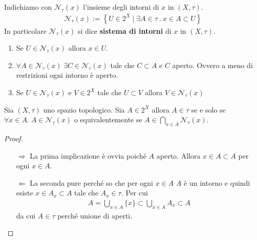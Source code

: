 \begin{definition}
	Indichiamo con $\mathcal{N}_\tau(x)$ l'insieme degli intorni di $x$ in $(X,\tau)$. 
	\begin{equation}
	\begin{aligned}
		\mathcal{N}_\tau(x) := \left\{ U \in 2^X \mid \exists A \in \tau\ .\ x \in A \subset U \right\}
	\end{aligned}
	\end{equation}
	In particolare $\mathcal{N}_\tau(x)$ si dice \textbf{sistema di intorni} di $x$ in $(X, \tau)$.
\end{definition}

\begin{remark}
	\label{rmk:intorni_top}
	\begin{enumerate}
		\item Se $U \in \mathcal{N}_\tau(x)$ allora $x \in U$.
		\item $\forall A \in \mathcal{N}_\tau(x) \; \exists C \in \mathcal{N}_\tau(x)$ tale che $C \subset A$ e $C$ aperto. Ovvero a meno di restrizioni ogni intorno è aperto.
		\item Se $U \in \mathcal{N}_\tau(x)$ e $V \in 2^X$ tale che $U \subset V$ allora $V \in \mathcal{N}_\tau(x)$ 
	\end{enumerate}	
\end{remark}

\begin{proposition}
	Sia $(X,\tau)$ uno spazio topologico. Sia $A \in 2^X$ allora $A \in \tau$ se e solo se $\forall x \in A . \; A \in \mathcal{N}_\tau(x)$ o equivalentemente se $A \in \bigcap_{x \in A} \mathcal{N}_\tau(x)$.
\end{proposition}
\begin{proof}
	\begin{enumerate}
		\item[$\Rightarrow$] La prima implicazione è ovvia poiché $A$ aperto. Allora $x \in A \subset A$ per ogni $x \in A$.
		\item[$\Leftarrow$]	La seconda pure perché so che per ogni $x \in A$ $A$ è un intorno e quindi esiste $x \in A_x \subset A$ tale che $A_x \in \tau$. Per cui  
		\begin{equation}
		\begin{aligned}
			A = \bigcup_{x \in A} \{x\} \subset \bigcup_{x\in A} A_x \subset A
		\end{aligned}
		\end{equation}
		da cui $A \in \tau$ perché unione di aperti. 
	\end{enumerate}
\end{proof}

